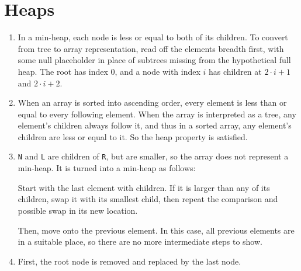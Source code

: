 \documentclass[11pt]{article}
\begin{document}
\section{Heaps}
\begin{enumerate}
\item In a min-heap, each node is less or equal to both of its children. To convert from tree to array representation, read off the elements breadth first, with some null placeholder in place of subtrees missing from the hypothetical full heap. The root has index \(0\), and a node with index \(i\) has children at \(2\cdot i+1\) and \(2\cdot i+2\).
\item When an array is sorted into ascending order, every element is less than or equal to every following element. When the array is interpreted as a tree, any element's children always follow it, and thus in a sorted array, any element's children are less or equal to it. So the heap property is satisfied.
\item
  \texttt N and \texttt L are children of \texttt R, but are smaller, so the array does not represent a min-heap. It is turned into a min-heap as follows:


  Start with the last element with children. If it is larger than any of its children, swap it with its smallest child, then repeat the comparison and possible swap in its new location.


  Then, move onto the previous element. In this case, all previous elements are in a suitable place, so there are no more intermediate steps to show.
\item
  First, the root node is removed and replaced by the last node.


\end{enumerate}
\end{document}
